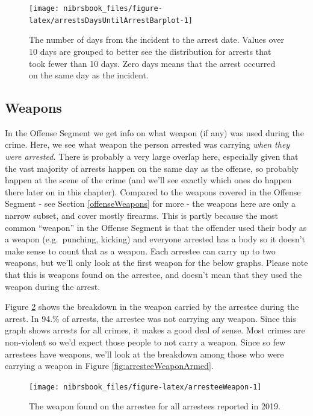 \documentclass[
  12pt,
  openany]{book}
\begin{document}
\begin{figure}

{\centering \texttt{[image: nibrsbook\_files/figure-latex/arrestsDaysUntilArrestBarplot-1]} 

}

\caption{The number of days from the incident to the arrest date. Values over 10 days are grouped to better see the distribution for arrests that took fewer than 10 days. Zero days means that the arrest occurred on the same day as the incident.}\label{fig:arrestsDaysUntilArrestBarplot}
\end{figure}

\hypertarget{weapons}{%
\subsection{Weapons}\label{weapons}}

In the Offense Segment we get info on what weapon (if any) was used during the crime. Here, we see what weapon the person arrested was carrying \emph{when they were arrested.} There is probably a very large overlap here, especially given that the vast majority of arrests happen on the same day as the offense, so probably happen at the scene of the crime (and we'll see exactly which ones do happen there later on in this chapter). Compared to the weapons covered in the Offense Segment - see Section \ref{offenseWeapons} for more - the weapons here are only a narrow subset, and cover mostly firearms. This is partly because the most common ``weapon'' in the Offense Segment is that the offender used their body as a weapon (e.g.~punching, kicking) and everyone arrested has a body so it doesn't make sense to count that as a weapon. Each arrestee can carry up to two weapons, but we'll only look at the first weapon for the below graphs. Please note that this is weapons found on the arrestee, and doesn't mean that they used the weapon during the arrest.

Figure \ref{fig:arresteeWeapon} shows the breakdown in the weapon carried by the arrestee during the arrest. In 94.\% of arrests, the arrestee was not carrying any weapon. Since this graph shows arrests for all crimes, it makes a good deal of sense. Most crimes are non-violent so we'd expect those people to not carry a weapon. Since so few arrestees have weapons, we'll look at the breakdown among those who were carrying a weapon in Figure \ref{fig:arresteeWeaponArmed}.

\begin{figure}

{\centering \texttt{[image: nibrsbook\_files/figure-latex/arresteeWeapon-1]} 

}

\caption{The weapon found on the arrestee for all arrestees reported in 2019.}\label{fig:arresteeWeapon}
\end{figure}
\end{document}
